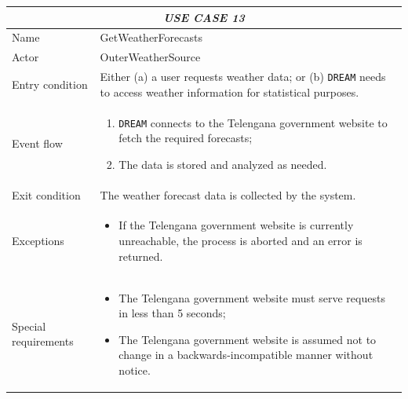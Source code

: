 \documentclass{article}
\begin{document}
\centering
\begin{longtable}{|p{3.5cm}|m{8cm}|}
 \hline
 \multicolumn{2}{|c|}{\cellcolor{white}\emph{USE CASE 13}} \\
 \endfirsthead
 \endhead
 \endfoot
 \endlastfoot
 \hline
 Name & GetWeatherForecasts\\
 \hline
 Actor & OuterWeatherSource\\
 \hline
 Entry condition & Either (a) a user requests weather data; or (b) \verb|DREAM| needs to access weather information for statistical purposes.\\
 \hline
 Event flow & \begin{enumerate}
    \item \verb|DREAM| connects to the Telengana government website to fetch the required forecasts;
    \item The data is stored and analyzed as needed.
 \end{enumerate}\\
 \hline
 Exit condition & The weather forecast data is collected by the system.\\
 \hline
 Exceptions & \begin{itemize}
     \item If the Telengana government website is currently unreachable, the process is aborted and an error is returned.
 \end{itemize}\\
 \hline
 Special requirements &\begin{itemize}
     \item The Telengana government website must serve requests in less than 5 seconds;
     \item The Telengana government website is assumed not to change in a backwards-incompatible manner without notice.
 \end{itemize}\\
 \hline
\end{longtable}
\newpage
\raggedright
\end{document}
